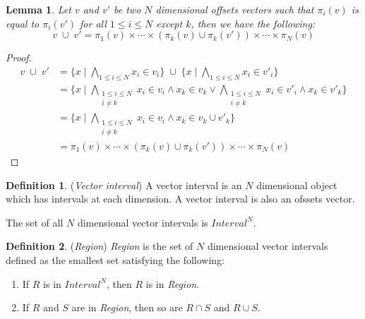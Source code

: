 \documentclass[acmlarge,review]{acmart}
\theoremstyle{definition}
\newtheorem{defn}{Definition}
\theoremstyle{plain}
\newtheorem{lem}{Lemma}
\theoremstyle{remark}
\begin{document}
\begin{lem}{}\label{lem:vector-union}
  Let $v$ and $v'$ be two $N$ dimensional offsets vectors such that $\pi_i(v)$
  is equal to $\pi_i(v')$ for all $1 \leq i \leq N$ except $k$, then we have the
  following:
%
  \begin{equation*}
    v \; \cup \; v'
    =
    \pi_1(v) \times \cdots \times
    (\pi_k(v) \cup \pi_k(v')) \times \cdots \times
    \pi_N(v)
  \end{equation*}
\end{lem}
%
\begin{proof}
  \begin{align*}
    v \; \cup \; v' &
    = \{x \mid
          \bigwedge_{1 \leq i \leq N } x_i \in v_i \}
      \;\cup\;
      \{x \mid
          \bigwedge_{1 \leq i \leq N } x_i \in v'_i \} \\
    & = \{x \mid
          \bigwedge_{\substack{1 \leq i \leq N \\ i \neq k}} x_i \in v_i
              \wedge x_k \in v_k \vee
          \bigwedge_{\substack{1 \leq i \leq N \\ i \neq k}} x_i \in v'_i
            \wedge x_k \in v'_k
        \} \\
    & = \{x \mid
          \bigwedge_{\substack{1 \leq i \leq N \\ i \neq k}} x_i \in v_i
          \wedge x_k \in v_k \cup v'_k
        \} \\
    & = \pi_1(v) \times \cdots \times
        (\pi_k(v) \cup \pi_k(v')) \times \cdots \times
        \pi_N(v)
  \end{align*}
\end{proof}

\begin{defn}{(\emph{Vector interval})}
  A vector interval is an $N$ dimensional object which has \zinf{} intervals at
  each dimension. A vector interval is also an ofssets vector.

  The set of all $N$ dimensional vector intervals is $\textit{Interval}^N$.
\end{defn}

\begin{defn}{(\emph{Region})}
  \textit{Region} is the set of $N$ dimensional vector intervals defined as the
  smallest set satisfying the following:
%
  \begin{enumerate}
    \item If $R$ is in $\textit{Interval}^N$, then $R$ is in \textit{Region}.
    \item If $R$ and $S$ are in \textit{Region}, then so are $R \cap S$ and $R
      \cup S$.
  \end{enumerate}
\end{defn}
\end{document}
